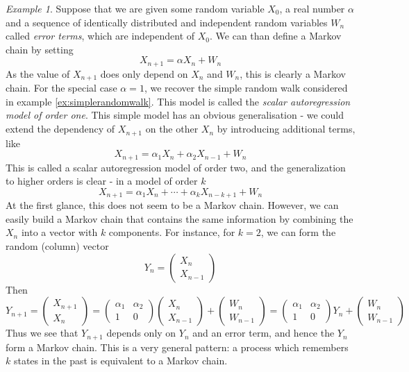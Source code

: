 \documentclass[a4paper, draft]{article}
\theoremstyle{own}
\theoremstyle{remark}
\newtheorem{example}{Example}[section]
\begin{document}
\begin{example}
Suppose that we are given some random variable $X_0$, a real number $\alpha$ and a sequence of identically distributed and independent random variables $W_n$ called {\em error terms}, which are independent of $X_0$. We can than define a Markov chain by setting
$$
X_{n+1} = \alpha X_n + W_n
$$
As the value of $X_{n+1}$ does only depend on $X_n$ and $W_n$, this is clearly a Markov chain. For the special case $\alpha = 1$, we recover the simple random walk considered in example \ref{ex:simplerandomwalk}. This model is called the {\em scalar autoregression model of order one}. This simple model has an obvious generalisation - we could extend the dependency of $X_{n+1}$ on the other $X_n$ by introducing additional terms, like
$$
X_{n+1} = \alpha_1 X_n + \alpha_2 X_{n-1} + W_n
$$
This is called a scalar autoregression model of order two, and the generalization to higher orders is clear - in a model of order $k$
$$
X_{n+1} = \alpha_1 X_n + \cdots + \alpha_k X_{n-k+1} + W_n
$$
At the first glance, this does not seem to be a Markov chain. However, we can easily build a Markov chain that contains the same information by combining the $X_n$ into a vector with $k$ components. For instance, for $k=2$, we can form the random (column) vector
$$
Y_n = \begin{pmatrix} X_n \\ X_{n-1} \end{pmatrix}
$$
Then 
$$
Y_{n+1} = \begin{pmatrix} X_{n+1} \\ X_n \end{pmatrix} = \begin{pmatrix} \alpha_1 & \alpha_2 \\ 1 & 0 \end{pmatrix}  \begin{pmatrix} X_n \\ X_{n-1} \end{pmatrix}  + \begin{pmatrix} W_n \\ W_{n-1} \end{pmatrix}
= \begin{pmatrix} \alpha_1 & \alpha_2 \\ 1 & 0 \end{pmatrix} Y_n + \begin{pmatrix} W_n \\ W_{n-1} \end{pmatrix}
$$
Thus we see that $Y_{n+1}$ depends only on $Y_n$ and an error term, and hence the $Y_n$ form a Markov chain. This is a very general pattern: a process which remembers $k$ states in the past is equivalent to a Markov chain.
\end{example}
\end{document}
